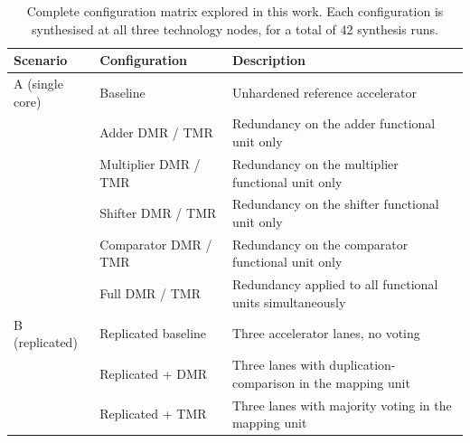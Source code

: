 \begin{table}[htbp]
\centering
\caption{Complete configuration matrix explored in this work. Each configuration is synthesised at all three technology nodes, for a total of 42 synthesis runs.}
\label{tab:matrix}
\small
\begin{tabular}{llp{7.5cm}}
\toprule
Scenario & Configuration & Description \\
\midrule
A (single core) & Baseline & Unhardened reference accelerator \\
 & Adder DMR / TMR & Redundancy on the adder functional unit only \\
 & Multiplier DMR / TMR & Redundancy on the multiplier functional unit only \\
 & Shifter DMR / TMR & Redundancy on the shifter functional unit only \\
 & Comparator DMR / TMR & Redundancy on the comparator functional unit only \\
 & Full DMR / TMR & Redundancy applied to all functional units simultaneously \\
B (replicated) & Replicated baseline & Three accelerator lanes, no voting \\
 & Replicated + DMR & Three lanes with duplication-comparison in the mapping unit \\
 & Replicated + TMR & Three lanes with majority voting in the mapping unit \\
\bottomrule
\end{tabular}
\end{table}
